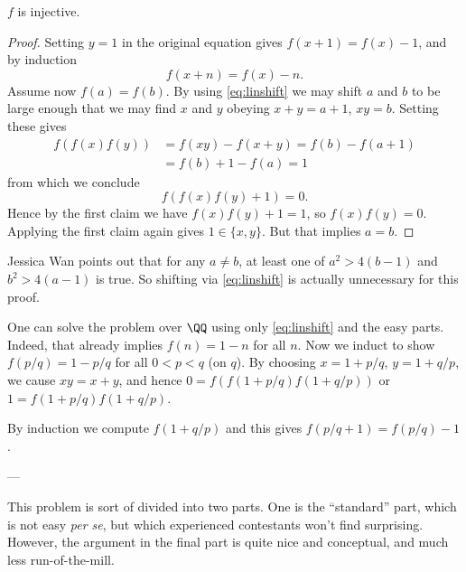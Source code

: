 \begin{claim*}
  $f$ is injective.
\end{claim*}
\begin{proof}
  Setting $y=1$ in the original equation gives
  $f(x+1) = f(x)-1$, and by induction
  \begin{equation}
    f(x+n) = f(x)-n.
    \label{eq:linshift}
  \end{equation}
  Assume now $f(a) = f(b)$.
  By using \eqref{eq:linshift} we may shift $a$ and $b$
  to be large enough that
  we may find $x$ and $y$ obeying $x+y=a+1$, $xy=b$.
  Setting these gives
  \begin{align*}
    f(f(x)f(y)) &= f(xy) - f(x+y) = f(b) - f(a+1) \\
    &= f(b) + 1 - f(a) = 1
  \end{align*}
  from which we conclude
  \[ f\left( f(x)f(y) + 1 \right) = 0. \]
  Hence by the first claim
  we have $f(x)f(y) + 1 = 1$, so $f(x)f(y) = 0$.
  Applying the first claim again gives $1 \in \{x,y\}$.
  But that implies $a=b$.
\end{proof}

\begin{remark*}
  Jessica Wan points out that
  for any $a \neq b$, at least one of $a^2 > 4(b-1)$
  and $b^2 > 4(a-1)$ is true.
  So shifting via \eqref{eq:linshift}
  is actually unnecessary for this proof.
\end{remark*}

\begin{remark*}
  One can solve the problem over $\QQ$
  using only \eqref{eq:linshift} and the easy parts.
  Indeed, that already implies $f(n) = 1-n$ for all $n$.
  Now we induct to show $f(p/q) = 1-p/q$ for all $0 < p < q$ (on $q$).
  By choosing $x = 1+p/q$, $y = 1+q/p$,
  we cause $xy = x+y$,
  and hence $0 = f\left( f(1+p/q)f(1+q/p) \right)$
  or $1 = f(1+p/q)f(1+q/p)$.

  By induction we compute $f(1+q/p)$
  and this gives $f(p/q+1) = f(p/q)-1$.
\end{remark*}

---

This problem is sort of divided into two parts.
One is the ``standard'' part, which is not easy \emph{per se},
but which experienced contestants won't find surprising.
However, the argument in the final part is quite nice and conceptual,
and much less run-of-the-mill.

